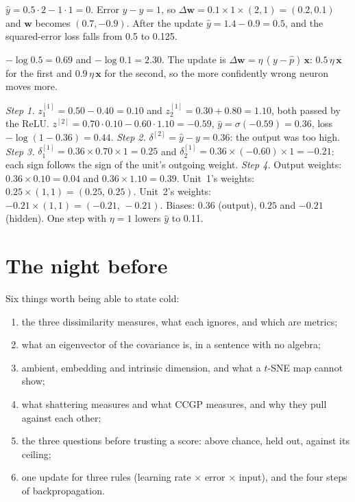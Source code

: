 \documentclass[11pt]{article}
\begin{document}
 $\hat y=0.5\cdot2-1\cdot1=0$. Error $y-\hat y=1$, so
$\Delta\mathbf{w}=0.1\times1\times(2,1)=(0.2,0.1)$ and $\mathbf{w}$ becomes
$(0.7,-0.9)$. After the update $\hat y=1.4-0.9=0.5$, and the squared-error loss
falls from 0.5 to 0.125.

 $-\log0.5=0.69$ and $-\log0.1=2.30$. The update is
$\Delta\mathbf{w}=\eta\,(y-\hat p)\,\mathbf{x}$: $0.5\,\eta\,\mathbf{x}$ for the
first and $0.9\,\eta\,\mathbf{x}$ for the second, so the more confidently wrong
neuron moves more.

 \emph{Step 1.} $z^{[1]}_1=0.50-0.40=0.10$ and $z^{[1]}_2=0.30+0.80=1.10$,
both passed by the ReLU. $z^{[2]}=0.70\cdot0.10-0.60\cdot1.10=-0.59$,
$\hat y=\sigma(-0.59)=0.36$, loss $-\log(1-0.36)=0.44$. \emph{Step 2.}
$\delta^{[2]}=\hat y-y=0.36$: the output was too high. \emph{Step 3.}
$\delta^{[1]}_1=0.36\times0.70\times1=0.25$ and $\delta^{[1]}_2=0.36\times(-0.60)\times1=-0.21$:
each sign follows the sign of the unit's outgoing weight. \emph{Step 4.} Output weights:
$0.36\times0.10=0.04$ and $0.36\times1.10=0.39$. Unit~1's weights: $0.25\times(1,1)=(0.25,\,0.25)$.
Unit~2's weights: $-0.21\times(1,1)=(-0.21,\,-0.21)$. Biases: $0.36$ (output), $0.25$
and $-0.21$ (hidden). One step with $\eta=1$ lowers $\hat y$ to 0.11.

\section*{The night before}

Six things worth being able to state cold:

\begin{enumerate}
  \item the three dissimilarity measures, what each ignores, and which are
        metrics;
  \item what an eigenvector of the covariance is, in a sentence with no algebra;
  \item ambient, embedding and intrinsic dimension, and what a $t$-SNE map cannot
        show;
  \item what shattering measures and what CCGP measures, and why they pull
        against each other;
  \item the three questions before trusting a score: above chance, held out,
        against its ceiling;
  \item one update for three rules (learning rate $\times$ error $\times$ input),
        and the four steps of backpropagation.
\end{enumerate}
\end{document}
